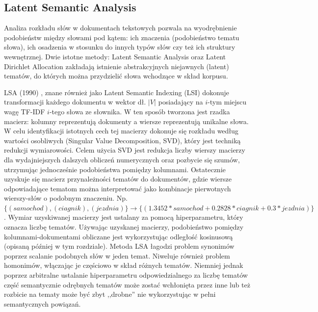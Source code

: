 \documentclass[pl]{minipw} %
\begin{document}
\subsection{Latent Semantic Analysis}
Analiza rozkładu słów w dokumentach tekstowych pozwala na wyodrębnienie podobieństw między słowami pod kątem: ich znaczenia (podobieństwo tematu słowa), ich osadzenia w stosunku do innych typów słów czy też ich struktury wewnętrznej. Dwie istotne metody: Latent Semantic Analysis \cite{lsa} oraz Latent Dirichlet Allocation \cite{lda} zakładają istnienie abstrakcyjnych niejawnych (latent) tematów, do których można przydzielić słowa wchodzące w skład korpusu.

LSA (1990) \cite{lsa}, znane również jako Latent Semantic Indexing (LSI) dokonuje transformacji każdego dokumentu w wektor dł. $|V|$ posiadający na $i$-tym miejscu wagę TF-IDF $i$-tego słowa ze słownika. W ten sposób tworzona jest rzadka macierz: kolumny reprezentują dokumenty a wiersze reprezentują unikalne słowa. W celu identyfikacji istotnych cech tej macierzy dokonuje się rozkładu według wartości osobliwych (Singular Value Decomposition\cite{svd}, SVD), który jest techniką redukcji wymiarowości. Celem użycia SVD jest redukcja liczby wierszy macierzy dla wydajniejszych dalszych obliczeń numerycznych oraz pozbycie się szumów, utrzymując jednocześnie podobieństwa pomiędzy kolumnami. Ostatecznie uzyskuje się macierz przynależności tematów do dokumentów, gdzie wiersze odpowiadające tematom można interpretować jako kombinacje pierwotnych wierszy-słów o podobnym znaczeniu. Np. $\{(samochod), (ciagnik), (jezdnia)\} \to \{(1.3452 * samochod + 0.2828 * ciagnik + 0.3 * jezdnia)\}$. Wymiar uzyskiwanej macierzy jest ustalany za pomocą hiperparametru, który oznacza liczbę tematów. Używając uzyskanej macierzy, podobieństwo pomiędzy kolumnami-dokumentami obliczane jest wykorzystując odległość kosinusową (opisaną później w tym rozdziale). Metoda LSA łagodzi problem synonimów poprzez scalanie podobnych słów w jeden temat. Niweluje również problem homonimów, włączając je częściowo w skład różnych tematów. Niemniej jednak poprzez arbitralne ustalanie hiperparametru odpowiedzialnego za liczbę tematów część semantycznie odrębnych tematów może zostać wchłonięta przez inne lub też rozbicie na tematy może być zbyt ,,drobne'' nie wykorzystując w pełni semantycznych powiązań.

\end{document}
